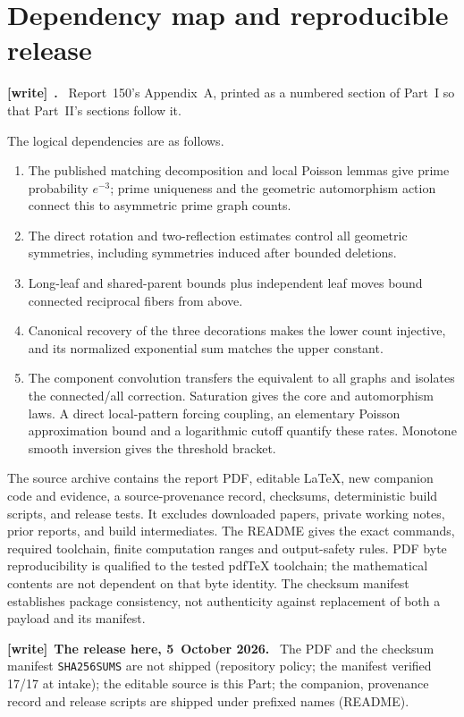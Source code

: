 \documentclass[11pt,letterpaper]{article}
\numberwithin{equation}{section}
\theoremstyle{definition}\newtheorem{definition}[theorem]{Definition}
\theoremstyle{remark}\newtheorem{remark}[theorem]{Remark}
\newcommand{\file}[1]{\nolinkurl{#1}}
\newenvironment{writenote}[1][]{\par\smallskip\begingroup\small
 \noindent\textbf{[write]}\if\relax\detokenize{#1}\relax\else~\textbf{#1.}\fi\ }%
 {\par\endgroup\smallskip}
\begin{document}
\section{Dependency map and reproducible release}\label{cgr:ld:app:dependency}
\begin{writenote}
Report~150's Appendix~A, printed as a numbered section of Part~I so that Part~II's sections follow it.
\end{writenote}
The logical dependencies are as follows.
\begin{enumerate}
\item The published matching decomposition and local Poisson
lemmas give prime probability $e^{-3}$; prime uniqueness and the
geometric automorphism action connect this to asymmetric prime
graph counts.
\item The direct rotation and two-reflection estimates control
all geometric symmetries, including symmetries induced after
bounded deletions.
\item Long-leaf and shared-parent bounds plus independent leaf
moves bound connected reciprocal fibers from above.
\item Canonical recovery of the three decorations makes the
lower count injective, and its normalized exponential sum matches
the upper constant.
\item The component convolution transfers the equivalent to all
graphs and isolates the connected/all correction. Saturation
gives the core and automorphism laws. A direct local-pattern
forcing coupling, an elementary Poisson approximation bound and a
logarithmic cutoff quantify these rates. Monotone smooth inversion
gives the threshold bracket.
\end{enumerate}
The source archive contains the report PDF, editable LaTeX,
new companion code and evidence, a source-provenance record,
checksums, deterministic build scripts, and release tests. It
excludes downloaded papers, private working notes, prior reports,
and build intermediates. The README gives the exact commands,
required toolchain, finite computation ranges and output-safety
rules. PDF byte reproducibility is qualified to the tested
pdfTeX toolchain; the mathematical contents are not dependent on
that byte identity. The checksum manifest establishes package
consistency, not authenticity against replacement of both a
payload and its manifest.
\begin{writenote}[The release here, 5~October 2026]
The PDF and the checksum manifest \file{SHA256SUMS} are not shipped (repository policy; the manifest verified 17/17 at intake); the editable source is this Part; the companion, provenance record and release scripts are shipped under prefixed names (README).
\end{writenote}
\end{document}
